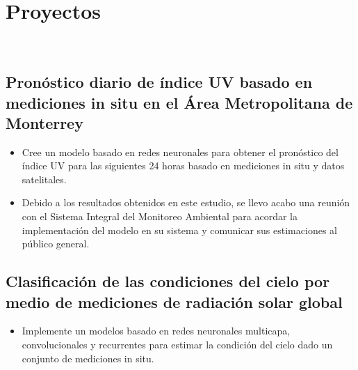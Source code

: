 \documentclass[a3paper]{adcv_color}
\begin{document}
\section{Proyectos}\\
\begin{addmargin}[0.5em]{0.5em}
	\subsection{Pronóstico diario de índice UV basado en mediciones in situ en el Área Metropolitana de Monterrey}
	\begin{itemize}
		\item Cree un modelo basado en redes neuronales para obtener el pronóstico del índice UV para las siguientes 24 horas basado en mediciones in situ y datos satelitales.
		\item Debido a los resultados obtenidos en este estudio, se llevo acabo una reunión con el Sistema Integral del Monitoreo Ambiental para acordar la implementación del modelo en su sistema y comunicar sus estimaciones al público general.
	\end{itemize}
	\subsection{Clasificación de las condiciones del cielo por medio de mediciones de radiación solar global}
	\begin{itemize}
		\item Implemente un modelos basado en redes neuronales multicapa, convolucionales y recurrentes para estimar la condición del cielo dado un conjunto de mediciones in situ.
	\end{itemize}

\end{addmargin}
\end{document}
